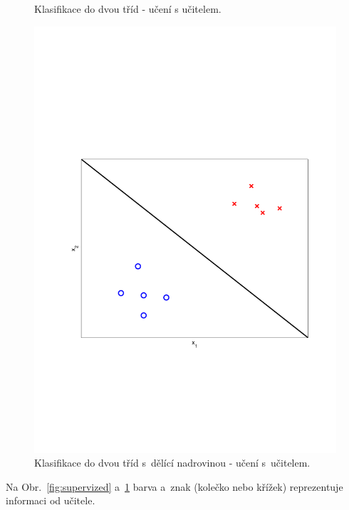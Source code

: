 {\begin{figure}[!ht]
\begin{minipage}[t]{0.48\textwidth}
  		\caption{Klasifikace do dvou tříd - učení s učitelem.}
		\label{fig:supervized}
	\end{minipage}%
	\hfill
	\begin{minipage}[t]{0.48\textwidth}
		\includegraphics[width = \textwidth, trim = 2.5cm 7cm 2cm 9cm]{./Img/UnsupervizedLearning/Intro/supervized_line.pdf}
  		\caption{Klasifikace do dvou tříd s~dělící nadrovinou - učení s~učitelem.}
		\label{fig:supervized_line}
	\end{minipage}%
\end{figure}}

\par{Na Obr.~\ref{fig:supervized} a~\ref{fig:supervized_line} barva a~znak (kolečko nebo křížek) reprezentuje informaci od učitele.}

\newpage




